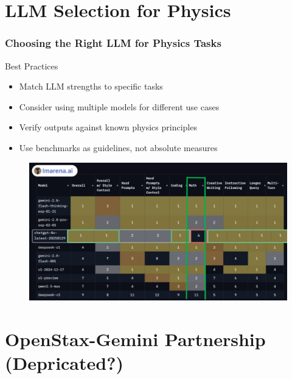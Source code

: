 \documentclass{beamer}
\begin{document}
\section{LLM Selection for Physics}
\frame{\sectionpage}

\begin{frame}
\frametitle{Choosing the Right LLM for Physics Tasks}

\begin{block}{Best Practices}
\begin{itemize}
\item Match LLM strengths to specific tasks
\item Consider using multiple models for different use cases
\item Verify outputs against known physics principles
\item Use benchmarks as guidelines, not absolute measures
\end{itemize}
\end{block}
\begin{figure}
    \centering
    \includegraphics[width=1\linewidth]{benchmarks.png}
\end{figure}
\end{frame}



\section{OpenStax-Gemini Partnership (Depricated?)}
\frame{\sectionpage}
\end{document}

